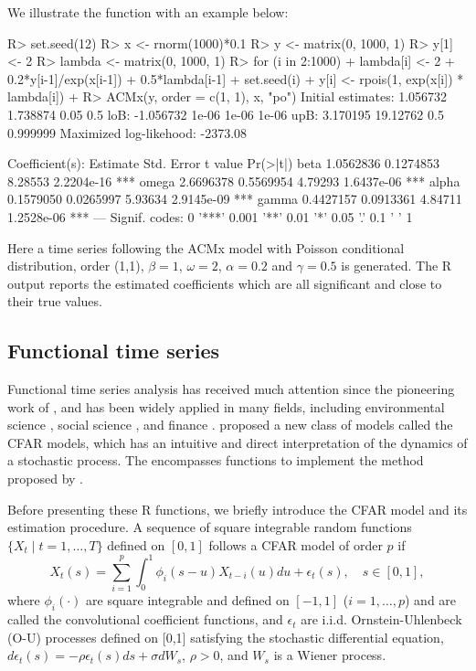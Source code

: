 We illustrate the function  with an example below:
\begin{example}
R> set.seed(12)
R> x <- rnorm(1000)*0.1
R> y <- matrix(0, 1000, 1)
R> y[1] <- 2
R> lambda <- matrix(0, 1000, 1)
R> for (i in 2:1000){
+    lambda[i] <- 2 + 0.2*y[i-1]/exp(x[i-1]) + 0.5*lambda[i-1]
+    set.seed(i)
+    y[i] <- rpois(1, exp(x[i]) * lambda[i])
+  }
R> ACMx(y, order = c(1, 1), x, "po")
Initial estimates:  1.056732 1.738874 0.05 0.5 
loB:  -1.056732 1e-06 1e-06 1e-06 
upB:  3.170195 19.12762 0.5 0.999999 
Maximized log-likehood:  -2373.08 

Coefficient(s):
       Estimate  Std. Error  t value   Pr(>|t|)    
beta  1.0562836   0.1274853  8.28553 2.2204e-16 ***
omega 2.6696378   0.5569954  4.79293 1.6437e-06 ***
alpha 0.1579050   0.0265997  5.93634 2.9145e-09 ***
gamma 0.4427157   0.0913361  4.84711 1.2528e-06 ***
---
Signif. codes:  0 '***' 0.001 '**' 0.01 '*' 0.05 '.' 0.1 ' ' 1
\end{example}

Here a time series following the ACMx model with Poisson conditional distribution, order (1,1), $\beta=1$, $\omega=2$, $\alpha=0.2$ and $\gamma=0.5$ is generated. The {R} output reports the estimated coefficients which are all significant and close to their true values.

\subsection{Functional time series}
Functional time series analysis has received much attention since the pioneering work of \cite{bosq2000}, and has been widely applied in many fields, including environmental science \citep{hormann2010}, social science \citep{hyndman2000}, and finance \citep{diebold2006,horvath2013}. \cite{liu2016functional} proposed a new class of models called the CFAR models, which has an intuitive
and direct interpretation of the dynamics of a stochastic process. The
 encompasses functions to implement the method proposed by \cite{liu2016functional}.

Before presenting these {R} functions, we briefly introduce the CFAR model and its estimation procedure. A sequence of square integrable random functions $\{X_t\mid t=1,\ldots, T\}$ defined on $[0,1]$ follows a CFAR model of order $p$ if
\[
X_t(s)=\sum_{i=1}^p \int_0^1 \phi_i(s-u)X_{t-i}(u)du +\epsilon_t(s), \quad s\in[0,1],
\]
where $\phi_i(\cdot)$ are square integrable and defined on $[-1,1]$ ($i=1,\ldots,p$) and are called the convolutional coefficient functions, and $\epsilon_t$ are i.i.d. Ornstein-Uhlenbeck (O-U) processes defined on [0,1] satisfying the stochastic differential equation, $d\epsilon_t(s)=-\rho \epsilon_t(s)ds+\sigma dW_s$, $\rho>0$, and $W_s$ is a Wiener process.

